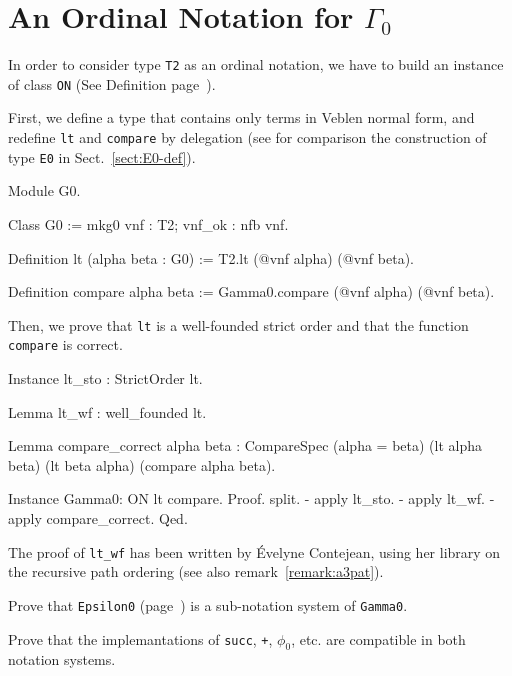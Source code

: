 {\section{An Ordinal Notation for \texorpdfstring{$\Gamma_0$}{\texttt{Gamma0}}}

In order to consider type \texttt{T2} as an ordinal notation, we have to build an instance of class \texttt{ON} (See Definition page~\pageref{types:ON}).

First, we define a type that contains only terms in Veblen normal form, and redefine \texttt{lt} and \texttt{compare} by delegation (see for comparison the construction of type \texttt{E0} in Sect.~\vref{sect:E0-def}).

\begin{Coqsrc}
Module G0.

Class G0 := mkg0 {vnf : T2; vnf_ok : nfb vnf}.

Definition lt (alpha beta : G0) := T2.lt (@vnf alpha) (@vnf beta).

Definition compare alpha beta := Gamma0.compare (@vnf alpha) (@vnf beta).
\end{Coqsrc}

Then, we prove that \texttt{lt} is a well-founded strict order and that the
function \texttt{compare} is correct.

\begin{Coqsrc}
Instance lt_sto : StrictOrder lt.

Lemma lt_wf : well_founded lt.

Lemma compare_correct alpha beta :
  CompareSpec (alpha = beta) (lt alpha beta) (lt beta alpha)
              (compare alpha beta).

Instance Gamma0: ON lt  compare.
Proof.
  split.
  - apply lt_sto.
  - apply lt_wf. 
  - apply compare_correct.
Qed.
\end{Coqsrc}


\begin{remark}
The proof of \texttt{lt\_wf} has been written by \'Evelyne Contejean, using her library on the recursive path ordering (see also remark~\vref{remark:a3pat}).
\end{remark}

\begin{project}
Prove that \texttt{Epsilon0} (page~\pageref{instance-epsilon0})
is a sub-notation system of \texttt{Gamma0}.

Prove that the implemantations of \texttt{succ}, \texttt{+}, $\phi_0$, etc.
are compatible in both notation systems.


\end{project}}
